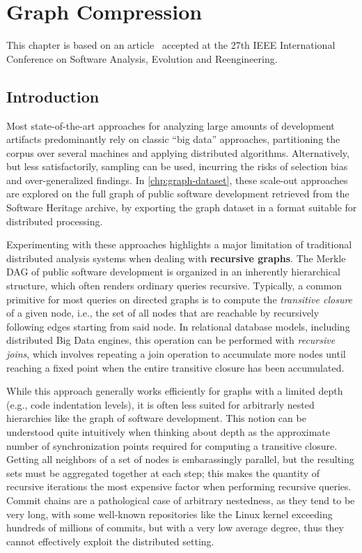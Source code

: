 \chapter{Graph Compression}%
\label{chp:graph-compression}

This chapter is based on an article~\cite{saner-2020-swh-graph} accepted at the
27th IEEE International Conference on Software Analysis, Evolution and
Reengineering.

\section{Introduction}%
\label{sec:compression-intro}

Most state-of-the-art approaches for analyzing large amounts of development
artifacts predominantly rely on classic ``big data'' approaches, partitioning the
corpus over several machines and applying distributed algorithms.
Alternatively, but less satisfactorily, sampling can be used, incurring the
risks of selection bias and over-generalized findings.
In \cref{chp:graph-dataset}, these scale-out approaches are explored on
the full graph of public software development retrieved from the Software
Heritage archive, by exporting the graph dataset in a format suitable for
distributed processing.

Experimenting with these approaches highlights a major limitation of
traditional distributed analysis systems when dealing with \textbf{recursive
graphs}. The Merkle \gls{DAG} of public software development is organized in an
inherently hierarchical structure, which often renders ordinary queries
recursive.
Typically, a common primitive for most queries on directed graphs is to
compute the \emph{transitive closure} of a given node, i.e., the set of all
nodes that are reachable by recursively following edges starting from said
node. In relational database models, including distributed Big Data engines,
this operation can be performed with \emph{recursive joins}, which involves
repeating a join operation to accumulate more nodes until reaching a fixed
point when the entire transitive closure has been accumulated.

While this approach generally works efficiently for graphs with a limited depth
(e.g., code indentation levels), it is often less suited for arbitrarly nested
hierarchies like the graph of software development.
This notion can be understood quite intuitively when thinking about depth as
the approximate number of synchronization points required for computing a
transitive closure. Getting all neighbors of a set of nodes is
embarassingly parallel, but the resulting sets must be aggregated together at
each step; this makes the quantity of recursive iterations the most expensive
factor when performing recursive queries.
Commit chains are a pathological case of arbitrary nestedness, as they tend to
be very long, with some well-known repositories like the Linux kernel exceeding
hundreds of millions of commits, but with a very low average degree, thus they
cannot effectively exploit the distributed setting.

